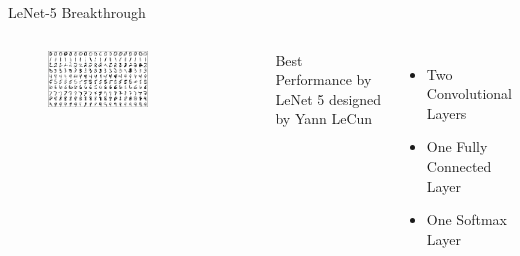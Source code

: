 \documentclass{beamer}
\begin{document}
    \begin{frame}{LeNet-5 Breakthrough}

      \begin{columns}[c]


          \begin{figure}
            \par\medskip
            \includegraphics[width=0.6\textwidth]{images/slides/mnist.png}
          \end{figure}


        \begin{center}
          Best Performance by LeNet 5 designed by Yann LeCun
        \end{center}
        \begin{itemize}
          \item Two Convolutional Layers
          \item One Fully Connected Layer
          \item One Softmax Layer
        \end{itemize}

      \end{columns}

      \end{frame}
\end{document}
